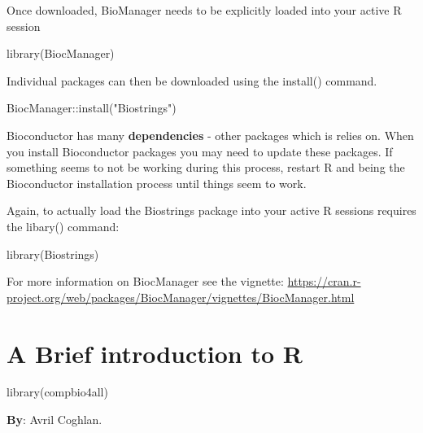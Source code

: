 \documentclass[
]{book}
\newenvironment{Shaded}{\begin{snugshade}}{\end{snugshade}}
\newcommand{\FunctionTok}[1]{\textcolor[rgb]{0.00,0.00,0.00}{#1}}
\newcommand{\NormalTok}[1]{#1}
\newcommand{\SpecialCharTok}[1]{\textcolor[rgb]{0.00,0.00,0.00}{#1}}
\newcommand{\StringTok}[1]{\textcolor[rgb]{0.31,0.60,0.02}{#1}}
\begin{document}
Once downloaded, BioManager needs to be explicitly loaded into your active R session

\begin{Shaded}
\begin{Highlighting}[]
\FunctionTok{library}\NormalTok{(BiocManager)}
\end{Highlighting}
\end{Shaded}

Individual packages can then be downloaded using the install() command.

\begin{Shaded}
\begin{Highlighting}[]
\NormalTok{BiocManager}\SpecialCharTok{::}\FunctionTok{install}\NormalTok{(}\StringTok{"Biostrings"}\NormalTok{)}
\end{Highlighting}
\end{Shaded}

Bioconductor has many \textbf{dependencies} - other packages which is relies on. When you install Bioconductor packages you may need to update these packages. If something seems to not be working during this process, restart R and being the Bioconductor installation process until things seem to work.

Again, to actually load the Biostrings package into your active R sessions requires the libary() command:

\begin{Shaded}
\begin{Highlighting}[]
\FunctionTok{library}\NormalTok{(Biostrings)}
\end{Highlighting}
\end{Shaded}

For more information on BiocManager see the vignette: \url{https://cran.r-project.org/web/packages/BiocManager/vignettes/BiocManager.html}

\hypertarget{a-brief-introduction-to-r}{%
\chapter{A Brief introduction to R}\label{a-brief-introduction-to-r}}

\begin{Shaded}
\begin{Highlighting}[]
\FunctionTok{library}\NormalTok{(compbio4all)}
\end{Highlighting}
\end{Shaded}

\textbf{By}: Avril Coghlan.
\end{document}
